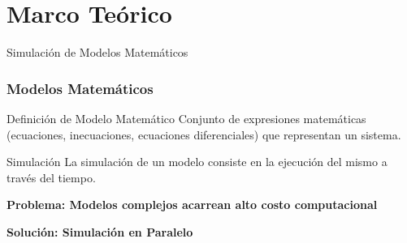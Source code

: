 \section{Marco Teórico}
\graphicspath{ {./intro/} }

\begin{frame}{Simulación de Modelos Matemáticos}
\frametitle{Modelos Matemáticos}


\begin{block}{Definición de Modelo Matemático}
Conjunto de expresiones matemáticas (ecuaciones, inecuaciones,
ecuaciones diferenciales) que representan un sistema.
\end{block}

\begin{block}{Simulación}
    La simulación de un modelo consiste en la ejecución del
    mismo a través del tiempo.
\end{block}

\vspace{1em}

\centering
\pause

\textbf{Problema: Modelos complejos acarrean alto costo computacional}

\pause

\vspace{1em}

\textbf{Solución: Simulación en Paralelo}

\end{frame}







